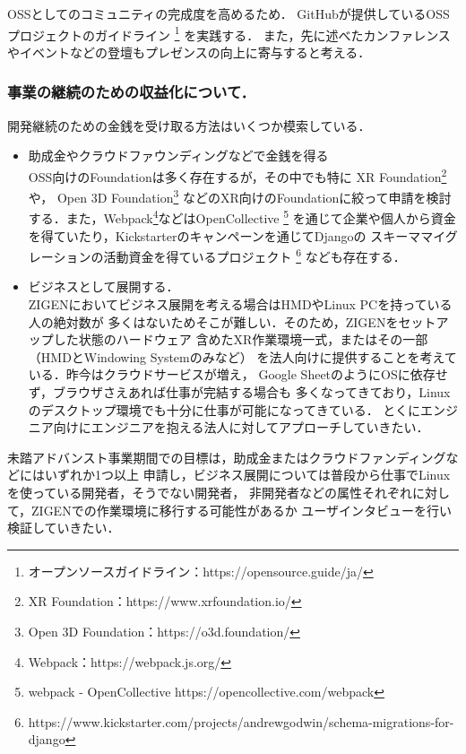 OSSとしてのコミュニティの完成度を高めるため．
GitHubが提供しているOSSプロジェクトのガイドライン
\footnote{オープンソースガイドライン：https://opensource.guide/ja/}
を実践する．
また，先に述べたカンファレンスやイベントなどの登壇もプレゼンスの向上に寄与すると考える．

\subsubsection*{事業の継続のための収益化について．}

開発継続のための金銭を受け取る方法はいくつか模索している．

\begin{itemize}
  \item 助成金やクラウドファウンディングなどで金銭を得る\\
        OSS向けのFoundationは多く存在するが，その中でも特に
        XR Foundation\footnote{XR Foundation：https://www.xrfoundation.io/}や，
        Open 3D Foundation\footnote{Open 3D Foundation：https://o3d.foundation/}
        などのXR向けのFoundationに絞って申請を検討する．また，Webpack\footnote{Webpack：https://webpack.js.org/}などはOpenCollective
        \footnote{webpack - OpenCollective https://opencollective.com/webpack}
        を通じて企業や個人から資金を得ていたり，Kickstarterのキャンペーンを通じてDjangoの
        スキーママイグレーションの活動資金を得ているプロジェクト
        \footnote{https://www.kickstarter.com/projects/andrewgodwin/schema-migrations-for-django}
        なども存在する．
  \item ビジネスとして展開する．\\
        ZIGENにおいてビジネス展開を考える場合はHMDやLinux PCを持っている人の絶対数が
        多くはないためそこが難しい．そのため，ZIGENをセットアップした状態のハードウェア
        含めたXR作業環境一式，またはその一部（HMDとWindowing Systemのみなど）
        を法人向けに提供することを考えている．昨今はクラウドサービスが増え，
        Google SheetのようにOSに依存せず，ブラウザさえあれば仕事が完結する場合も
        多くなってきており，Linuxのデスクトップ環境でも十分に仕事が可能になってきている．
        とくにエンジニア向けにエンジニアを抱える法人に対してアプローチしていきたい．
\end{itemize}

未踏アドバンスト事業期間での目標は，助成金またはクラウドファンディングなどにはいずれか1つ以上
申請し，ビジネス展開については普段から仕事でLinuxを使っている開発者，そうでない開発者，
非開発者などの属性それぞれに対して，ZIGENでの作業環境に移行する可能性があるか
ユーザインタビューを行い検証していきたい．

